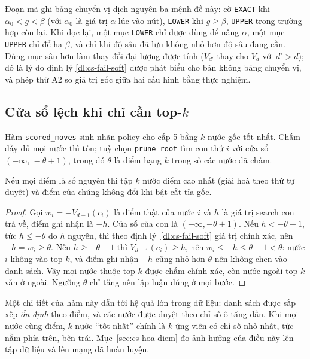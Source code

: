 Đoạn mã ghi bảng chuyển vị dịch nguyên ba mệnh đề này: cờ \texttt{EXACT} khi
$\alpha_0<g<\beta$ (với $\alpha_0$ là giá trị $\alpha$ lúc vào nút), \texttt{LOWER} khi $g\ge\beta$,
\texttt{UPPER} trong trường hợp còn lại. Khi đọc lại, một mục \texttt{LOWER} chỉ được dùng để nâng $\alpha$, một
mục \texttt{UPPER} chỉ để hạ $\beta$, và chỉ khi độ sâu đã lưu không nhỏ hơn độ sâu đang cần. Dùng mục sâu hơn
làm thay đổi đại lượng được tính ($V_{d'}$ thay cho $V_d$ với $d'>d$); đó là lý do định lý
\ref{dl:cs-fail-soft} được phát biểu cho bản không bảng chuyển vị, và phép thử A2 so giá trị gốc giữa hai cấu
hình bằng thực nghiệm.

\subsection{Cửa sổ lệch khi chỉ cần top-\texorpdfstring{$k$}{k}}
Hàm \texttt{scored\_moves} sinh nhãn policy cho cấp 5 bằng $k$ nước gốc tốt nhất. Chấm đầy đủ mọi nước thì tốn;
tuỳ chọn \texttt{prune\_root} tìm con thứ $i$ với cửa sổ $(-\infty,\,-\theta+1)$, trong đó $\theta$ là điểm hạng
$k$ trong số các nước đã chấm.
\begin{dinhly}
\label{dl:cs-topk}
Nếu mọi điểm là số nguyên thì tập $k$ nước điểm cao nhất (giải hoà theo thứ tự duyệt) và điểm của chúng không đổi
khi bật cắt tỉa gốc.
\end{dinhly}
\begin{proof}
Gọi $w_i=-V_{d-1}(c_i)$ là điểm thật của nước $i$ và $h$ là giá trị search con trả về, điểm ghi nhận là $-h$.
Cửa sổ của con là $(-\infty,-\theta+1)$. Nếu $h<-\theta+1$, tức $h\le-\theta$ do $h$ nguyên, thì theo
định lý~\ref{dl:cs-fail-soft} giá trị chính xác, nên $-h=w_i\ge\theta$. Nếu $h\ge-\theta+1$ thì
$V_{d-1}(c_i)\ge h$, nên $w_i\le -h\le\theta-1<\theta$: nước $i$ không vào top-$k$, và điểm ghi nhận $-h$ cũng nhỏ
hơn $\theta$ nên không chen vào danh sách. Vậy mọi nước thuộc top-$k$ được chấm chính xác, còn nước ngoài top-$k$
vẫn ở ngoài. Ngưỡng $\theta$ chỉ tăng nên lập luận đúng ở mọi bước.
\end{proof}
Một chi tiết của hàm này dẫn tới hệ quả lớn trong dữ liệu: danh sách được sắp xếp \emph{ổn định} theo điểm, và
các nước được duyệt theo chỉ số ô tăng dần. Khi mọi nước cùng điểm, $k$ nước ``tốt nhất'' chính là $k$ ứng viên
có chỉ số nhỏ nhất, tức nằm phía trên, bên trái. Mục~\ref{sec:cs-hoa-diem} đo ảnh hưởng của điều này lên tập dữ
liệu và lên mạng đã huấn luyện.

